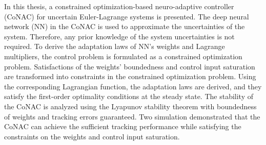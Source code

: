 
\summary

In this thesis, a constrained optimization-based neuro-adaptive controller \allowbreak (CoNAC) for uncertain Euler-Lagrange systems is presented. 
The deep neural network (NN) in the CoNAC is used to approximate the uncertainties of the system.
Therefore, any prior knowledge of the system uncertainties is not required.
To derive the adaptation laws of NN's weights and Lagrange multipliers, the control problem is formulated as a constrained optimization problem.
Satisfactions of the weights' boundedness and control input saturation are transformed into constraints in the constrained optimization problem.
Using the corresponding Lagrangian function, the adaptation laws are derived, and they satisfy the first-order optimality conditions at the steady state.
The stability of the CoNAC is analyzed using the Lyapunov stability theorem with boundedness of weights and tracking errors guaranteed.
Two simulation demonstrated that the CoNAC can achieve the sufficient tracking performance while satisfying the constraints on the weights and control input saturation.


